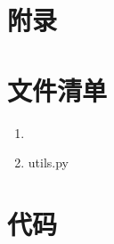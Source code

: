 \documentclass[UTF-8,a4paper,zihao=-4]{ctexart}
\begin{document}
\section*{附录}
\appendix

\section{文件清单}

\begin{enumerate}
    \item 
    \item utils.py
\end{enumerate}

\section{代码}

\end{document}
